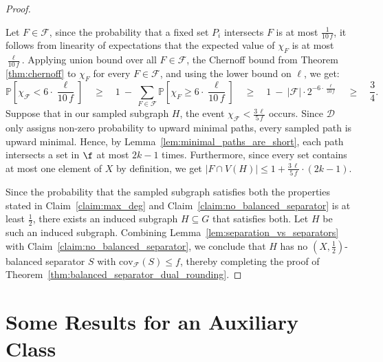 \begin{proof}
\begin{claimproof}
        Let $F\in\mathcal{F}$, since the probability that a fixed set $P_i$ intersects $F$ is at most $\frac{1}{10\, f}$, it follows from linearity of expectations that the expected value of $\chi_F$ is at most $\frac{\ell}{10\, f}$. Applying union bound over all $F\in\mathcal{F}$, the Chernoff bound from Theorem \ref{thm:chernoff} to $\chi_F$ for every $F\in\mathcal{F}$, and using the lower bound on $\ell$, we get: 
        $$
        \mathbb{P}\left[\chi_{\mathcal{F}} < 6 \cdot \frac{\ell}{10\,f}\right] \quad
        \geq \quad 1\ -\ \sum_{F\in\mathcal{F}}\mathbb{P}\left[\chi_F \geq 6 \cdot \frac{\ell}{10\,f}\right] \quad
        \geq \quad 1\ -\ |\mathcal{F}| \cdot 2^{-6 \cdot \frac{\ell}{10\,f}} \quad
        \geq \quad \frac{3}{4}.
        $$
        Suppose that in our sampled subgraph $H$, the event $\chi_{\mathcal{F}} < \frac{3\, \ell}{5\,f}$ occurs. Since $\mathcal{D}$ only assigns non-zero probability to upward minimal paths, every sampled path is upward minimal. Hence, by Lemma~\ref{lem:minimal_paths_are_short}, each path intersects a set in $\f$ at most $2k-1$ times. Furthermore, since every set contains at most one element of $X$ by definition, we get $|F\cap V(H)|\leq 1 + \frac{3\, \ell}{5\, f}\cdot (2k-1)$.
    \end{claimproof}

Since the probability that the sampled subgraph satisfies both the properties stated in Claim~\ref{claim:max_deg} and Claim~\ref{claim:no_balanced_separator} is at least $\frac{1}{2}$, there exists an induced subgraph $H \subseteq G$ that satisfies both. Let $H$ be such an induced subgraph. Combining Lemma~\ref{lem:separation_vs_separators} with Claim~\ref{claim:no_balanced_separator}, we conclude that $H$ has no $(X,\frac{1}{2})$-balanced separator $S$ with $\mathrm{cov}_{\mathcal{F}}(S) \leq f$, thereby completing the proof of Theorem~\ref{thm:balanced_separator_dual_rounding}.
\end{proof}

\section{Some Results for an Auxiliary Class}\label{sec:weird_class}



